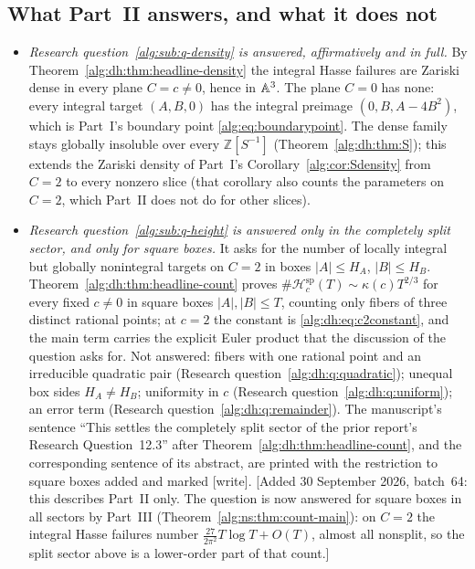 \documentclass[11pt]{article}
\numberwithin{equation}{section}
\theoremstyle{plain}
\theoremstyle{plain}
\theoremstyle{plain}
\theoremstyle{definition}
\theoremstyle{definition}
\theoremstyle{definition}
\theoremstyle{remark}
\newcommand{\Z}{\mathbb Z}\newcommand{\Q}{\mathbb Q}
\newcommand{\wtag}{\textup{[write]}}%
\newcommand{\Hsplit}{\mathcal H^{\mathrm{sp}}}
\begin{document}
\subsection{What Part~II answers, and what it does not}\label{alg:dh:sec:answers}
\begin{itemize}[itemsep=2pt,topsep=3pt]
\item \emph{Research question~\ref{alg:sub:q-density} is answered,
affirmatively and in full.} By Theorem~\ref{alg:dh:thm:headline-density}
the integral Hasse failures are Zariski dense in every plane $C=c\ne0$,
hence in $\mathbb A^3$. The plane $C=0$ has none: every integral target
$(A,B,0)$ has the integral preimage $(0,B,A-4B^2)$, which is Part~I's
boundary point \eqref{alg:eq:boundarypoint}. The dense family stays
globally insoluble over every $\Z[S^{-1}]$
(Theorem~\ref{alg:dh:thm:S}); this extends the Zariski density of Part~I's
Corollary~\ref{alg:cor:Sdensity} from $C=2$ to every nonzero slice
(that corollary also counts the parameters on $C=2$, which Part~II does
not do for other slices).
\item \emph{Research question~\ref{alg:sub:q-height} is answered only in
the completely split sector, and only for square boxes.} It asks for the
number of locally integral but globally nonintegral targets on $C=2$ in
boxes $|A|\le H_A$, $|B|\le H_B$.
Theorem~\ref{alg:dh:thm:headline-count} proves
$\#\Hsplit_c(T)\sim\kappa(c)T^{2/3}$ for every fixed $c\ne0$ in square
boxes $|A|,|B|\le T$, counting only fibers of three distinct rational
points; at $c=2$ the constant is \eqref{alg:dh:eq:c2constant}, and the
main term carries the explicit Euler product that the discussion of the
question asks for. Not answered: fibers with one rational point and an
irreducible quadratic pair (Research question~\ref{alg:dh:q:quadratic});
unequal box sides $H_A\ne H_B$; uniformity in $c$ (Research
question~\ref{alg:dh:q:uniform}); an error term (Research
question~\ref{alg:dh:q:remainder}). The manuscript's sentence ``This
settles the completely split sector of the prior report's Research
Question~12.3'' after Theorem~\ref{alg:dh:thm:headline-count}, and the
corresponding sentence of its abstract, are printed with the restriction
to square boxes added and marked \wtag.
[Added 30 September 2026, batch~64: this describes Part~II only. The
question is now answered for square boxes in all sectors by Part~III
(Theorem~\ref{alg:ns:thm:count-main}): on $C=2$ the integral Hasse
failures number $\frac{27}{2\pi^2}T\log T+O(T)$, almost all nonsplit, so
the split sector above is a lower-order part of that count.]

\end{itemize}
\end{document}
